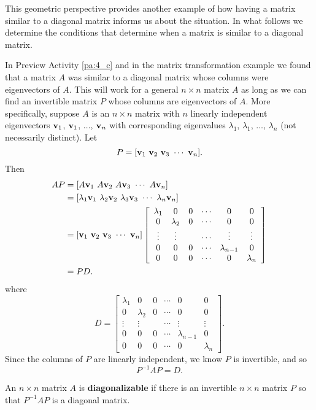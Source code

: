 This geometric perspective provides another example of how having a matrix similar to a diagonal matrix informs us about the situation. In what follows we determine the conditions that determine when a matrix is similar to a diagonal matrix. 


In Preview Activity \ref{pa:4_c} and in the matrix transformation example we found that a matrix $A$ was similar to a diagonal matrix whose columns were eigenvectors of $A$. This will work for a general $n \times n$ matrix $A$ as long as we can find an invertible matrix $P$ whose columns are eigenvectors of $A$. More specifically, suppose $A$ is an $n \times n$ matrix with $n$ linearly independent eigenvectors $\mathbf{v}_1$, $\mathbf{v}_1$, $\ldots$, $\mathbf{v}_n$ with corresponding eigenvalues $\lambda_1$, $\lambda_1$, $\ldots$, $\lambda_n$ (not necessarily distinct). Let
\[P = [ \mathbf{v}_1 \  \mathbf{v}_2  \ \mathbf{v}_3  \ \cdots  \ \mathbf{v}_n].\]
Then
\begin{align*}
AP &= [ A\vv_1  \ A\vv_2  \ A\vv_3  \ \cdots  \ A\vv_n] \\
    &= [ \lambda_1\vv_1  \ \lambda_2\vv_2  \ \lambda_3\vv_3  \ \cdots  \ \lambda_n\vv_n] \\
    &= [ \vv_1 \  \vv_2  \ \vv_3  \ \cdots  \ \vv_n]\left[ \begin{array}{cccccc} \lambda_1&0&0&\cdots&0&0 \\ 0&\lambda_2&0&\cdots&0&0 \\ \vdots&\vdots&& \cdots&\vdots&\vdots \\ 0&0&0&\cdots&\lambda_{n-1}&0 \\  0&0&0&\cdots&0&\lambda_{n} \end{array} \right] \\
    &= P D.
\end{align*}
where 
\[D = \left[ \begin{array}{cccccc} \lambda_1&0&0&\cdots&0&0 \\ 0&\lambda_2&0&\cdots&0&0 \\ \vdots&\vdots&& \cdots&\vdots&\vdots \\ 0&0&0&\cdots&\lambda_{n-1}&0 \\  0&0&0&\cdots&0&\lambda_{n} \end{array} \right].\]
Since the columns of $P$ are linearly independent, we know $P$ is invertible, and so
\[P^{-1}AP = D.\]



\begin{definition} An $n \times n$ matrix $A$ is \textbf{diagonalizable} if there is an invertible $n \times n$ matrix $P$ so that $P^{-1}AP$ is a diagonal matrix.
\end{definition}



